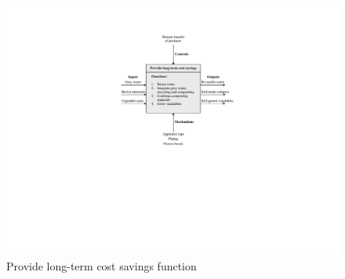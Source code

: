 \documentclass[a4paper,11pt,fleqn]{report}
\begin{document}
%
\begin{figure}[h!]
\begin{center}
\includegraphics[scale = 0.8]{Function3.pdf}
\caption{Provide long-term cost savings function}
\label{fig: Function3}
\end{center}
\end{figure}
\end{document}
